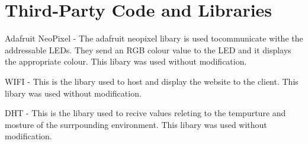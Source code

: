 \chapter{Third-Party Code and Libraries}

Adafruit NeoPixel - The adafruit neopixel libary is used tocommunicate withe the addressable LEDs. They send an RGB colour value to the LED and it displays the appropriate colour. This libary was used without modification.

WIFI - This is the libary used to host and display the website to the client. This libary was used without modification.

DHT - This is the libary used to recive values releting to the tempurture and mosture of the surrpounding environment. This libary was used without modification.